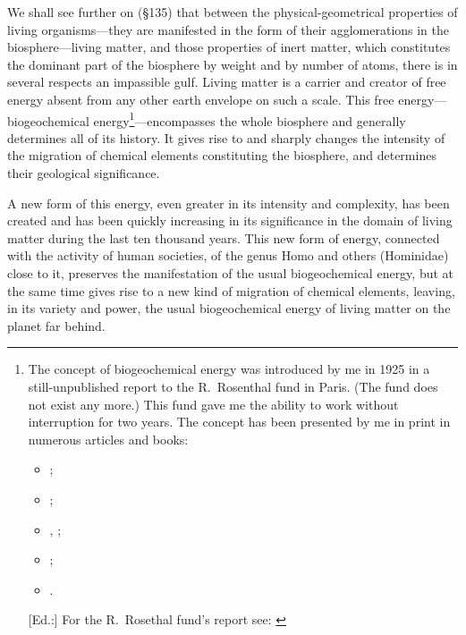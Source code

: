 We shall see further on (§135) that between the physical-geometrical
properties of living organisms---they are manifested in the form of their
agglomerations in the biosphere---living matter, and those properties of inert
matter, which constitutes the dominant part of the biosphere by weight and by
number of atoms, there is in several respects an impassible gulf.  Living
matter is a carrier and creator of free energy absent from any other earth
envelope on such a scale.  This free energy---biogeochemical
energy\footnote{
	The concept of biogeochemical energy was introduced by me in 1925 in a
	still-unpublished report to the R.~Rosenthal fund in Paris. (The fund
	does not exist any more.)  This fund gave me the ability to work
	without interruption for two years.  The concept has been presented by
	me in print in numerous articles and books:
	\begin{itemize}
	  \item \foreignlanguage{russian}{\cite{vernadsky1926biosfera-p30-48}};
	  \item \foreignlanguage{french}{\cite{vernadsky1926etudes1,
		  vernadsky1927etudes2}};
	  \item \foreignlanguage{russian}{\cite{vernadsky1926razmnozhenii1},
		  \cite{vernadsky1926razmnozhenii2}};
	  \item \foreignlanguage{french}{\cite{vernadsky1926multiplication1,
		  vernadsky1926multiplication2}};
	  \item \foreignlanguage{russian}{\cite{vernadsky1927bakteriofag}}.
	\end{itemize}
	[Ed.:] For the R.~Rosethal fund's report
	\foreignlanguage{russian}{} see:
	\foreignlanguage{russian}{\cite{vernadsky1994zhivoe-p555-602}}
}---encompasses the whole biosphere and generally determines all of its
history.  It gives rise to and sharply changes the intensity of the migration
of chemical elements constituting the biosphere, and determines their
geological significance.

A new form of this energy, even greater in its intensity and complexity, has
been created and has been quickly increasing in its significance in the domain
of living matter during the last ten thousand years.  This new form of energy,
connected with the activity of human societies, of the genus Homo and others
(Hominidae) close to it, preserves the manifestation of the usual
biogeochemical energy, but at the same time gives rise to a new kind of
migration of chemical elements, leaving, in its variety and power, the usual
biogeochemical energy of living matter on the planet far behind.

